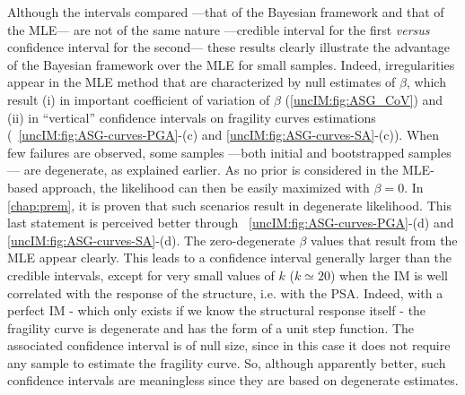   Although the intervals compared ---that of the Bayesian framework and that of the MLE--- are not of the same nature ---credible interval for the first \emph{versus} confidence interval for the second--- these results clearly illustrate the advantage of the Bayesian framework over the MLE for small samples. Indeed, irregularities appear in the MLE method that are characterized by null estimates of $\beta$, which result (i) in important coefficient of variation of $\beta$  (\cref{uncIM:fig:ASG_CoV}) and (ii) in ``vertical'' confidence intervals on fragility curves estimations (~\ref{uncIM:fig:ASG-curves-PGA}-(c) and \ref{uncIM:fig:ASG-curves-SA}-(c)). {When few failures are observed, some samples ---both initial and bootstrapped samples--- are degenerate, as explained earlier.} As no prior is considered in the MLE-based approach, the likelihood can then be easily maximized with $\beta=0$. In \cref{chap:prem}, it is proven that such scenarios result in degenerate likelihood. This last statement is perceived better through ~\ref{uncIM:fig:ASG-curves-PGA}-(d) and \ref{uncIM:fig:ASG-curves-SA}-(d). The zero-degenerate $\beta$ values that result from the MLE appear clearly. This leads to a confidence interval generally larger than the credible intervals, except for very small values of $k$ ($k \simeq 20$) when the IM is well correlated with the response of the structure, i.e. with the PSA. Indeed, with a perfect IM - which only exists if we know the structural response itself - the fragility curve is degenerate and has the form of a unit step function. The associated confidence interval is of null size, since in this case it does not require any sample to estimate the fragility curve. So, although apparently better, such confidence intervals are meaningless since they are based on degenerate estimates.
  

  
          

